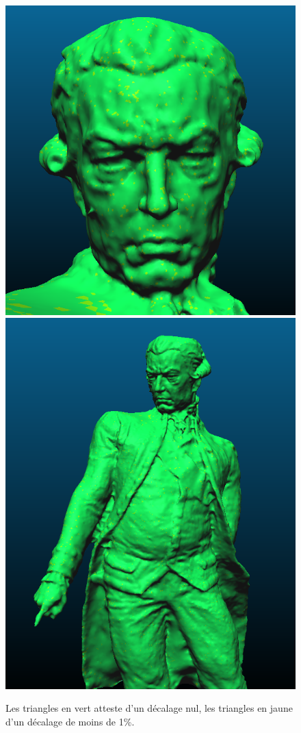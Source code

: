 \documentclass[12pt, twoside]{article}
\begin{document}
\begin{figure}[h]
\centering
\includegraphics[scale=0.4]{Comparo2.png} \includegraphics[scale=0.4]{Comparo3.png}
\caption{\label{fig:comparo} Les triangles en vert atteste d'un décalage nul, les triangles en jaune d'un décalage de moins de 1\%.}
\end{figure}
\end{document}
